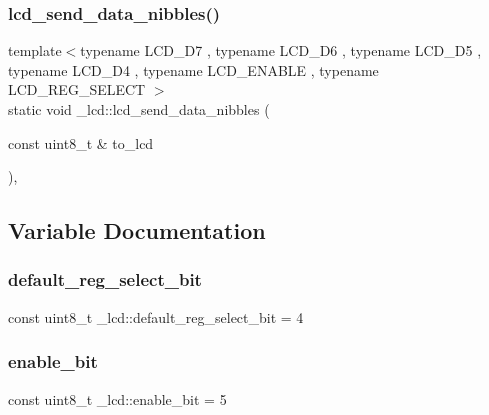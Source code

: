 \subsubsection{\texorpdfstring{lcd\+\_\+send\+\_\+data\+\_\+nibbles()}{lcd\_send\_data\_nibbles()}}
{\footnotesize\ttfamily template$<$typename L\+C\+D\+\_\+\+D7 , typename L\+C\+D\+\_\+\+D6 , typename L\+C\+D\+\_\+\+D5 , typename L\+C\+D\+\_\+\+D4 , typename L\+C\+D\+\_\+\+E\+N\+A\+B\+LE , typename L\+C\+D\+\_\+\+R\+E\+G\+\_\+\+S\+E\+L\+E\+CT $>$ \\
static void \+\_\+lcd\+::lcd\+\_\+send\+\_\+data\+\_\+nibbles (\begin{DoxyParamCaption}\item[{const uint8\+\_\+t \&}]{to\+\_\+lcd }\end{DoxyParamCaption})\hspace{0.3cm}{\ttfamily [inline]}, {\ttfamily [static]}}



\subsection{Variable Documentation}
\hypertarget{namespace__lcd_a190af2ac38800a5d174d5ff7194542bf}{}\label{namespace__lcd_a190af2ac38800a5d174d5ff7194542bf} 
\subsubsection{\texorpdfstring{default\+\_\+reg\+\_\+select\+\_\+bit}{default\_reg\_select\_bit}}
{\footnotesize\ttfamily const uint8\+\_\+t \+\_\+lcd\+::default\+\_\+reg\+\_\+select\+\_\+bit = 4\hspace{0.3cm}{\ttfamily [static]}}

\hypertarget{namespace__lcd_a7b5c01ba44bccac5ddabf03bb93f96a2}{}\label{namespace__lcd_a7b5c01ba44bccac5ddabf03bb93f96a2} 
\subsubsection{\texorpdfstring{enable\+\_\+bit}{enable\_bit}}
{\footnotesize\ttfamily const uint8\+\_\+t \+\_\+lcd\+::enable\+\_\+bit = 5\hspace{0.3cm}{\ttfamily [static]}}

